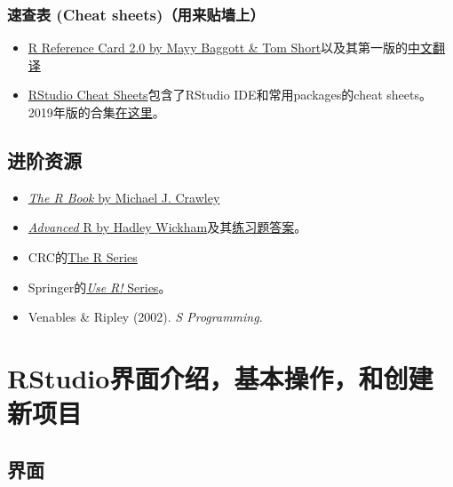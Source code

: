 \documentclass[]{book}
\providecommand{\tightlist}{%
  \setlength{\itemsep}{0pt}\setlength{\parskip}{0pt}}
\begin{document}
\hypertarget{cheatsheet}{%
\subsubsection{速查表 (Cheat sheets)（用来贴墙上）}\label{cheatsheet}}

\begin{itemize}
\tightlist
\item
  \href{https://cran.r-project.org/doc/contrib/Baggott-refcard-v2.pdf}{R Reference Card 2.0 by Mayy Baggott \& Tom Short}以及其第一版的\href{https://cran.r-project.org/doc/contrib/Liu-R-refcard.pdf}{中文翻译}
\item
  \href{https://www.rstudio.com/resources/cheatsheets/}{RStudio Cheat Sheets}包含了RStudio IDE和常用packages的cheat sheets。2019年版的合集\href{https://www.rstudio.com/wp-content/uploads/2019/01/Cheatsheets_2019.pdf}{在这里}。
\end{itemize}

\subsection{进阶资源}

\begin{itemize}
\tightlist
\item
  \href{https://github.com/TianyiShi2001/R-Tutorial-Resorces/blob/master/资源/书籍/TheRBook.pdf}{\emph{The R Book} by Michael J. Crawley}
\item
  \href{https://adv-r.hadley.nz/index.html}{\emph{Advanced} R by Hadley Wickham}及其\href{https://advanced-r-solutions.rbind.io}{练习题答案}。
\item
  CRC的\href{https://www.crcpress.com/Chapman--HallCRC-The-R-Series/book-series/CRCTHERSER}{The R Series}
\item
  Springer的\href{https://www.springer.com/series/6991?detailsPage=titles}{\emph{Use R!} Series}。
\item
  Venables \& Ripley (2002). \emph{S Programming}.
\end{itemize}

\hypertarget{interface-basics-project}{%
\section{RStudio界面介绍，基本操作，和创建新项目}\label{interface-basics-project}}

\hypertarget{interface}{%
\subsection{界面}\label{interface}}
\end{document}
